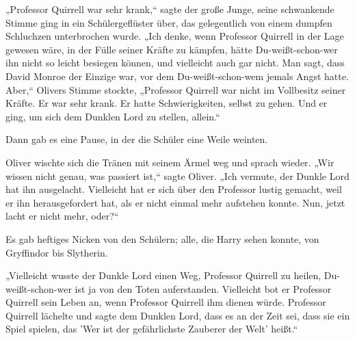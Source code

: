 „Professor Quirrell war sehr krank,“ sagte der große Junge, seine schwankende Stimme ging in ein Schülergeflüster über, das gelegentlich von einem dumpfen Schluchzen unterbrochen wurde.
„Ich denke, wenn Professor Quirrell in der Lage gewesen wäre, in der Fülle seiner Kräfte zu kämpfen, hätte Du-weißt-schon-wer ihn nicht so leicht besiegen können, und vielleicht auch gar nicht. Man sagt, dass David Monroe der Einzige war, vor dem Du-weißt-schon-wem jemals Angst hatte. Aber,“ Olivers Stimme stockte, „Professor Quirrell war nicht im Vollbesitz seiner Kräfte. Er war sehr krank. Er hatte Schwierigkeiten, selbst zu gehen. Und er ging, um sich dem Dunklen Lord zu stellen, allein.“

Dann gab es eine Pause, in der die Schüler eine Weile weinten.

Oliver wischte sich die Tränen mit seinem Ärmel weg und sprach wieder.
„Wir wissen nicht genau, was passiert ist,“ sagte Oliver. „Ich vermute, der Dunkle Lord hat ihn ausgelacht. Vielleicht hat er sich über den Professor lustig gemacht, weil er ihn herausgefordert hat, als er nicht einmal mehr aufstehen konnte. Nun, jetzt lacht er nicht mehr, oder?“

Es gab heftiges Nicken von den Schülern; alle, die Harry sehen konnte, von Gryffindor bis Slytherin.

„Vielleicht wusste der Dunkle Lord einen Weg, Professor Quirrell zu heilen, Du-weißt-schon-wer ist ja von den Toten auferstanden. Vielleicht bot er Professor Quirrell sein Leben an, wenn Professor Quirrell ihm dienen würde. Professor Quirrell lächelte und sagte dem Dunklen Lord, dass es an der Zeit sei, dass sie ein Spiel spielen, das 'Wer ist der gefährlichste Zauberer der Welt' heißt.“

